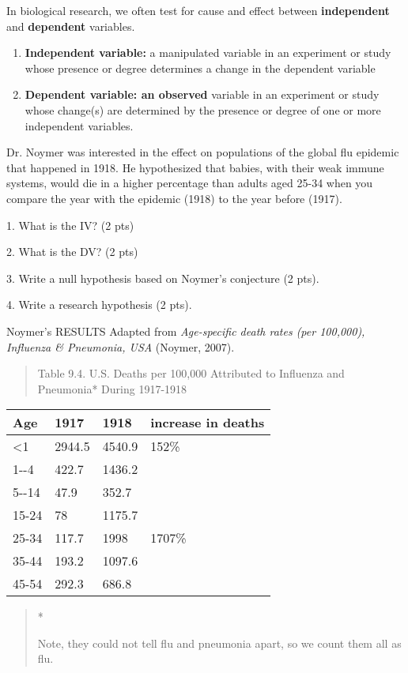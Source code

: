 In biological research, we often test for cause and effect between
\textbf{independent} and \textbf{dependent} variables.

\begin{enumerate}
\def\labelenumi{\arabic{enumi}.}
\item
  \textbf{Independent variable:} a manipulated variable in an experiment
  or study whose presence or degree determines a change in the dependent
  variable
\item
  \textbf{Dependent variable: an observed} variable in an experiment or
  study whose change(s) are determined by the presence or degree of one
  or more independent variables.
\end{enumerate}

Dr. Noymer was interested in the effect on populations of the global flu
epidemic that happened in 1918. He hypothesized that babies, with their
weak immune systems, would die in a higher percentage than adults aged
25-34 when you compare the year with the epidemic (1918) to the year
before (1917).

1. What is the IV? (2 pts)

2. What is the DV? (2 pts)

3. Write a null hypothesis based on Noymer's conjecture (2 pts).

4. Write a research hypothesis (2 pts).

Noymer's RESULTS Adapted from \emph{Age-specific death rates (per
100,000), Influenza \& Pneumonia, USA} (Noymer, 2007).

\begin{quote}
Table 9.4. U.S. Deaths per 100,000 Attributed to Influenza and
Pneumonia* During 1917-1918
\end{quote}

\begin{longtable}[c]{@{}llll@{}}
\toprule
Age & 1917 & 1918 & increase in deaths\tabularnewline
\midrule
\endhead
\textless{}1 & 2944.5 & 4540.9 & 152\%\tabularnewline
1-\/-4 & 422.7 & 1436.2 &\tabularnewline
5-\/-14 & 47.9 & 352.7 &\tabularnewline
15-24 & 78 & 1175.7 &\tabularnewline
25-34 & 117.7 & 1998 & 1707\%\tabularnewline
35-44 & 193.2 & 1097.6 &\tabularnewline
45-54 & 292.3 & 686.8 &\tabularnewline
\bottomrule
\end{longtable}

\begin{quote}
*

Note, they could not tell flu and pneumonia apart, so we count them all
as flu.
\end{quote}

